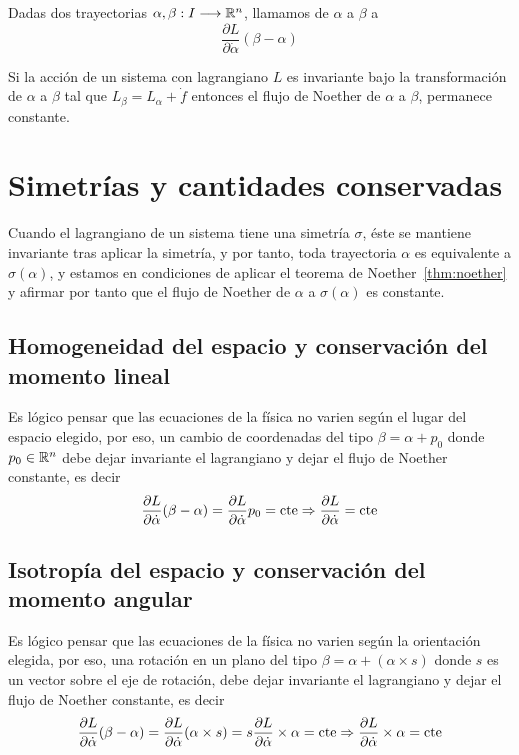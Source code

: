 \begin{definition}
    Dadas dos trayectorias $\alpha,\beta:I\longrightarrow \mathbb{R}^n$, llamamos  de $\alpha$ a $\beta$ a
    \begin{equation}
        \label{eq:flujo_noether}
        \frac{\partial L}{\partial\dot{\alpha}}(\beta-\alpha)
    \end{equation}
\end{definition}

\begin{theorem}
    \label{thm:noether}
    Si la acción de un sistema con lagrangiano $L$ es invariante bajo la transformación de $\alpha$ a $\beta$ tal que $L_\beta=L_\alpha+\dot{f}$ entonces el flujo de Noether de $\alpha$ a $\beta$, permanece constante.
\end{theorem}


\chapter{Simetrías y cantidades conservadas}
Cuando el lagrangiano de un sistema tiene una simetría $\sigma$, éste se mantiene invariante tras aplicar la simetría, y por tanto, toda trayectoria $\alpha$ es equivalente a $\sigma(\alpha)$, y estamos en condiciones de aplicar el teorema de Noether~\eqref{thm:noether} y afirmar por tanto que el flujo de Noether de $\alpha$ a $\sigma(\alpha)$ es constante.


\section{Homogeneidad del espacio y conservación del momento lineal}
Es lógico pensar que las ecuaciones de la física no varien según el lugar del espacio elegido, por eso, un cambio de coordenadas del tipo $\beta=\alpha+p_0$ donde $p_0\in\mathbb{R}^n$ debe dejar invariante el lagrangiano y dejar el flujo de Noether constante, es decir
\begin{equation}
    \label{eq:conservacion_momento_lineal}
    \frac{\partial L}{\partial\dot{\alpha}}(\beta-\alpha) = \frac{\partial L}{\partial\dot{\alpha}}p_0=\text{cte}\Rightarrow\frac{\partial L}{\partial\dot{\alpha}}=\text{cte}
\end{equation}


\section{Isotropía del espacio y conservación del momento angular}
Es lógico pensar que las ecuaciones de la física no varien según la orientación elegida, por eso, una rotación en un plano del tipo $\beta=\alpha + (\alpha\times s)$ donde $s$ es un vector sobre el eje de rotación, debe dejar invariante el lagrangiano y dejar el flujo de Noether constante, es decir
\begin{equation}
    \label{eq:conservacion_momento_angular}
    \frac{\partial L}{\partial\dot{\alpha}}(\beta-\alpha) = \frac{\partial L}{\partial\dot{\alpha}}(\alpha\times s) = s \frac{\partial L}{\partial\dot{\alpha}}\times \alpha=\text{cte}\Rightarrow\frac{\partial L}{\partial\dot{\alpha}}\times \alpha=\text{cte}
\end{equation}


